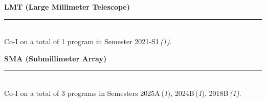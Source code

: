 \documentclass[11pt]{article}
\makeatletter
\def\vhrulefill#1{\leavevmode\leaders\hrule \@height #1\hfill \kern\z@}
\newcommand{\subsectionname}[1]{{\large\bf #1 \vhrulefill{0.5pt}}}
\makeatother
\begin{document}

\subsectionname{LMT \textmd{\small (Large Millimeter Telescope)}}\\
Co-I on a total of 1 program in Semester 2021-S1\,{\em(1)}.\medskip



\subsectionname{SMA \textmd{\small (Submillimeter Array)}}\\
Co-I on a total of 3 programs in Semesters 2025A\,({\em1}), 2024B\,({\em1}), 2018B\,{\em(1)}.\medskip
\end{document}
